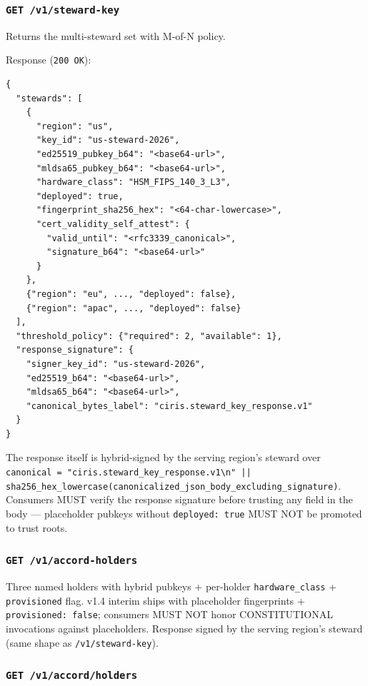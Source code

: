 \documentclass[11pt]{article}
\begin{document}
\subsubsection*{\texttt{GET /v1/steward-key}}


Returns the multi-steward set with M-of-N policy.


Response (\texttt{200 OK}):


\begin{lstlisting}
{
  "stewards": [
    {
      "region": "us",
      "key_id": "us-steward-2026",
      "ed25519_pubkey_b64": "<base64-url>",
      "mldsa65_pubkey_b64": "<base64-url>",
      "hardware_class": "HSM_FIPS_140_3_L3",
      "deployed": true,
      "fingerprint_sha256_hex": "<64-char-lowercase>",
      "cert_validity_self_attest": {
        "valid_until": "<rfc3339_canonical>",
        "signature_b64": "<base64-url>"
      }
    },
    {"region": "eu", ..., "deployed": false},
    {"region": "apac", ..., "deployed": false}
  ],
  "threshold_policy": {"required": 2, "available": 1},
  "response_signature": {
    "signer_key_id": "us-steward-2026",
    "ed25519_b64": "<base64-url>",
    "mldsa65_b64": "<base64-url>",
    "canonical_bytes_label": "ciris.steward_key_response.v1"
  }
}
\end{lstlisting}

The response itself is hybrid-signed by the serving region's steward over \texttt{canonical = "ciris.steward\_key\_response.v1\textbackslash{}n" || sha256\_hex\_lowercase(canonicalized\_json\_body\_excluding\_signature)}. Consumers MUST verify the response signature before trusting any field in the body — placeholder pubkeys without \texttt{deployed: true} MUST NOT be promoted to trust roots.


\subsubsection*{\texttt{GET /v1/accord-holders}}


Three named holders with hybrid pubkeys + per-holder \texttt{hardware\_class} + \texttt{provisioned} flag. v1.4 interim ships with placeholder fingerprints + \texttt{provisioned: false}; consumers MUST NOT honor CONSTITUTIONAL invocations against placeholders. Response signed by the serving region's steward (same shape as \texttt{/v1/steward-key}).


\subsubsection*{\texttt{GET /v1/accord/holders}}
\end{document}
